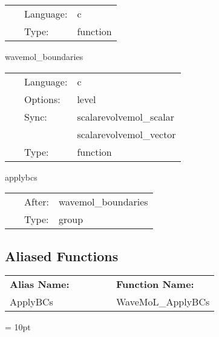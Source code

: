 \begin{tabular*}{160mm}{cll} 
~ & Language:  & c \\ 
~ & Type:  & function \\ 
\end{tabular*} 


\vspace{5mm}


\hspace{5mm} wavemol\_boundaries 

\hspace{5mm}{\it register boundary enforcement in mol } 


\hspace{5mm}

 \begin{tabular*}{160mm}{cll} 
~ & Language:  & c \\ 
~ & Options:  & level \\ 
~ & Sync:  & scalarevolvemol\_scalar \\ 
~& ~ &scalarevolvemol\_vector\\ 
~ & Type:  & function \\ 
\end{tabular*} 


\vspace{5mm}


\hspace{5mm} applybcs 

\hspace{5mm}{\it apply boundary conditions for wavemol } 


\hspace{5mm}

 \begin{tabular*}{160mm}{cll} 
~ & After:  & wavemol\_boundaries \\ 
~ & Type:  & group \\ 
\end{tabular*} 


\subsection*{Aliased Functions}

\hspace{5mm}

 \begin{tabular*}{160mm}{ll} 

{\bf Alias Name:} ~~~~~~~ & {\bf Function Name:} \\ 
ApplyBCs & WaveMoL\_ApplyBCs \\ 
\end{tabular*} 



\vspace{5mm}\parskip = 10pt 
